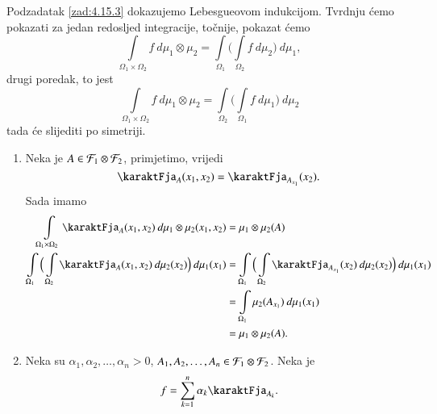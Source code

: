 \begin{rj}[\ref{zad:4.15}]
\begin{enumerate}[label=(\roman*)]
        Podzadatak \ref{zad:4.15.3} dokazujemo Lebesgueovom indukcijom.
        Tvrdnju \' cemo pokazati za jedan redosljed integracije, to\v cnije, pokazat \' cemo
        \begin{equation*}
            \int\limits_{\Omega_1 \times \Omega_2} f \: d \mu_1 \otimes \mu_2 = \int\limits_{\Omega_1} \Big( \int\limits_{\Omega_2} f \: d \mu_2 \Big) \: d \mu_1,
        \end{equation*}
        drugi poredak, to jest
        \begin{equation*}
            \int\limits_{\Omega_1 \times \Omega_2} f \: d \mu_1 \otimes \mu_2 = \int\limits_{\Omega_2} \Big( \int\limits_{\Omega_1} f \: d \mu_1 \Big) \: d \mu_2
        \end{equation*}
        tada \' ce slijediti po simetriji.
        \begin{enumerate}[label=\arabic*. korak:]
            \item
            Neka je $A \in \mathcal{F}_1 \otimes \mathcal{F}_2$, primjetimo, vrijedi
            \begin{equation*}
                \karaktFja_A (x_1, x_2) = \karaktFja_{A_{x_1}} (x_2).
            \end{equation*}
            Sada imamo
            \begin{equation*}
                \begin{aligned}
                    \int\limits_{\Omega_1 \times \Omega_2} \karaktFja_A (x_1, x_2) \: d \mu_1 \otimes \mu_2 (x_1, x_2) &= \mu_1 \otimes \mu_2 (A)\\
                    \int\limits_{\Omega_1} \Big( \int\limits_{\Omega_2} \karaktFja_A (x_1, x_2) \: d \mu_2 (x_2) \Big) \: d \mu_1 (x_1) &= \int\limits_{\Omega_1} \Big( \int\limits_{\Omega_2} \karaktFja_{A_{x_1}} (x_2) \: d \mu_2 (x_2) \Big) \: d  \mu_1 (x_1)\\
                    &= \int\limits_{\Omega_1} \mu_2 (A_{x_1}) \: d \mu_1 (x_1)\\
                    &= \mu_1 \otimes \mu_2 (A).
                \end{aligned}
            \end{equation*}
            \item
            Neka su $\alpha_1, \alpha_2, \ldots, \alpha_n > 0$, $A_1, A_2, \ldots, A_n \in \mathcal{F}_1 \otimes \mathcal{F}_2$.
            Neka je
            \begin{equation*}
                f = \suma{k = 1}{n} \alpha_k \karaktFja_{A_k}.
            \end{equation*}

\end{enumerate}
\end{enumerate}
\end{rj}
